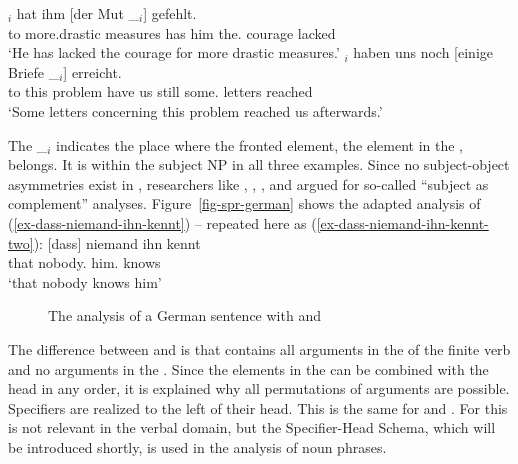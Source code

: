 \ex 
{}$_i$ hat ihm [der Mut \_$_i$] gefehlt.\\
     \spacebr{}to more.drastic measures has him \spacebr{}the.\NOM{} courage {} lacked\\
\glt `He has lacked the courage for more drastic measures.'
\ex 
{}$_i$ haben uns noch [einige Briefe \_$_i$] erreicht.\footnotemark\\
     \spacebr{}to this problem have us still \spacebr{}some.\NOM{} letters {} reached\\
\glt `Some letters concerning this problem reached us afterwards.'
\zl

\noindent
The \_$_i$ indicates the place where the fronted element, the element in the \vf, belongs. It is
within the subject NP in all three examples. Since no subject-object asymmetries exist in ,
researchers like \citet[]{Pollard90a}, \citet[Section~6.3.2]{Haider93a}, \citet[]{Eisenberg94b}, and \citet[, 78]{Kiss95a} argued for so-called ``subject as complement'' analyses. 
Figure~\vref{fig-spr-german} shows the adapted analysis of
(\ref{ex-dass-niemand-ihn-kennt}) -- repeated here as
(\ref{ex-dass-niemand-ihn-kennt-two}):
\ea
\label{ex-dass-niemand-ihn-kennt-two}
\gll  {}[dass] niemand ihn kennt\\
      \spacebr{}that nobody.\NOM{} him.\ACC{} knows\\ 
\glt `that nobody knows him'
\z
\begin{figure}
\caption{\label{fig-spr-german}The analysis of a German sentence with \spr and \compsl}
\end{figure}
\largerpage
The difference between  and  is that  contains all arguments in the \compsl of
the finite verb and no arguments in the \sprl. Since the elements in the \compsl can be combined
with the head in any order, it is explained why all permutations of arguments are
possible. Specifiers are realized to the left of their head. This is the same for  and
. For  this is not relevant in the verbal domain, but the Specifier-Head Schema, which
will be introduced shortly, is used in the analysis of noun phrases.


